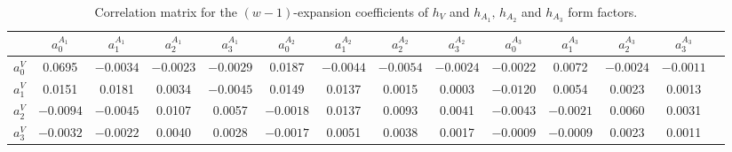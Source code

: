 \documentclass[aps,superscriptaddress,showpacs,nofootinbib,11pt]{revtex4-1}
\newcommand\tstrut{\rule{0pt}{2.9ex}}       %
\begin{document}
\begin{table}[h]
\begin{ruledtabular}
\begin{center}
\footnotesize{\begin{tabular}{cccccccccccccc}
 & $a_0^{{A_1}}$&$a_1^{{A_1}}$&$a_2^{{A_1}}$&$a_3^{{A_1}}$
& $a_0^{{A_2}}$&$a_1^{{A_2}}$&$a_2^{{A_2}}$&$a_3^{{A_2}}$& $a_0^{{A_3}}$&$a_1^{{A_3}}$&$a_2^{{A_3}}$&$a_3^{{A_3}}$\\ \hline \tstrut
$a_0^{{V}}$&   \hspace{.25cm}0.0695&  $-0.0034$&  $-0.0023$&  $-0.0029$&   \hspace{.25cm}0.0187&  $-0.0044$&  $-0.0054$&  $-0.0024$&  $-0.0022$&   \hspace{.25cm}0.0072&  $-0.0024$&  $-0.0011$\\
 $a_1^{{V}}$ & \hspace{.25cm}0.0151&   \hspace{.25cm}0.0181&   \hspace{.25cm}0.0034&  $-0.0045$&   \hspace{.25cm}0.0149&   \hspace{.25cm}0.0137&   \hspace{.25cm}0.0015&   \hspace{.25cm}0.0003&  $-0.0120$&   \hspace{.25cm}0.0054&   \hspace{.25cm}0.0023&   \hspace{.25cm}0.0013\\
$a_2^{{V}}$&  $-0.0094$&  $-0.0045$&   \hspace{.25cm}0.0107&   \hspace{.25cm}0.0057&  $-0.0018$&   \hspace{.25cm}0.0137&   \hspace{.25cm}0.0093&   \hspace{.25cm}0.0041&  $-0.0043$&  $-0.0021$&   \hspace{.25cm}0.0060&   \hspace{.25cm}0.0031\\
 $a_3^{{V}}$ &$-0.0032$&  $-0.0022$&   \hspace{.25cm}0.0040&   \hspace{.25cm}0.0028& $ -0.0017$&   \hspace{.25cm}0.0051&   \hspace{.25cm}0.0038&   \hspace{.25cm}0.0017&  $-0.0009$&  $-0.0009$&   \hspace{.25cm}0.0023&   \hspace{.25cm}0.0011\\
\end{tabular}}
    \caption{Correlation matrix for the $(w-1)$-expansion coefficients of $h_V$ and   $h_{A_1},\,h_{A_2}$ and $h_{A_3}$  form factors. }
   \label{tab:ha123hv}
   \end{center}
   \end{ruledtabular}
\end{table}
\end{document}
